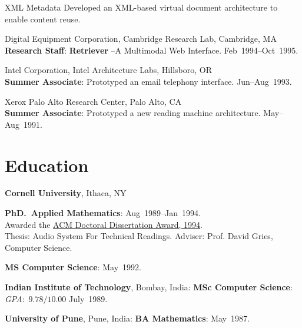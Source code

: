\documentclass{article}
\begin{document}
\begin{compactitem}
\begin{compactdesc}
\item[XML Metadata] Developed an XML-based virtual document
  architecture to enable  content reuse.
\end{compactdesc}
\item   {Digital Equipment Corporation},  {Cambridge Research Lab}, Cambridge, MA\\
  \textbf{Research Staff}: \textbf{Retriever} --A Multimodal Web
  Interface.  \hfill Feb~1994--Oct~1995.
\item {Intel Corporation}, {Intel Architecture Labs},
  Hillsboro, OR\\
  \textbf{Summer Associate}: Prototyped an email telephony
  interface. \hfill Jun--Aug~1993.
\item {Xerox Palo Alto Research Center}, Palo Alto, CA\\
  \textbf{Summer Associate}: Prototyped a new reading machine
  architecture. \hfill May--Aug~1991.
\end{compactitem}

\longpage

\section*{Education}

\begin{compactitem}
\item \textbf{Cornell University}, Ithaca, NY
\begin{compactitem}
\item \textbf{PhD.\ Applied Mathematics}: \hfill
  Aug~1989--Jan~1994.\\
  \hspace*{.1in} Awarded the
\href{http://www.acm.org/awards/dd_citation/1994B.html}{%
  ACM Doctoral Dissertation Award, 1994}.\\
\hspace*{.1in} {Thesis}: {Audio System For Technical Readings}.
 {Adviser}: Prof. David Gries, Computer Science.
\item \textbf{MS Computer Science}: \hfill May~1992.
\end{compactitem}
\item \textbf{Indian Institute of Technology}, Bombay, India:
  \textbf{MSc Computer Science}: \textit{GPA}:~$9.78/10.00$
  \hfill July~1989.
\item \textbf{University of Pune}, Pune, India: \textbf{BA
    Mathematics}: \hfill May~1987.
\end{compactitem}
\end{document}

